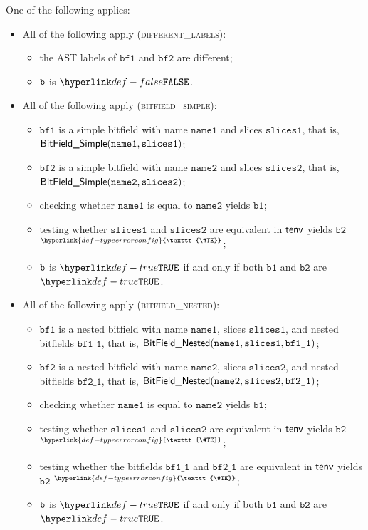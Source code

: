 \documentclass{book}
\newcommand\TypeErrorConfig[0]{\hyperlink{def-typeerrorconfig}{\texttt{\#TE}}}
\newcommand\ProseOrTypeError[0]{\hyperlink{def-proseortypeerror}{$^{\TypeErrorConfig}$}}
\newcommand\bfone[0]{\texttt{bf1}}
\newcommand\bftwo[0]{\texttt{bf2}}
\newcommand\bfoneone[0]{\texttt{bf1\_1}}
\newcommand\bftwoone[0]{\texttt{bf2\_1}}
\newcommand\vbone[0]{\texttt{b1}}
\newcommand\vbtwo[0]{\texttt{b2}}
\newcommand\nameone[0]{\texttt{name1}}
\newcommand\nametwo[0]{\texttt{name2}}
\newcommand\slicesone[0]{\texttt{slices1}}
\newcommand\slicestwo[0]{\texttt{slices2}}
\begin{document}
One of the following applies:
\begin{itemize}
  \item All of the following apply (\textsc{different\_labels}):
  \begin{itemize}
    \item the AST labels of $\bfone$ and $\bftwo$ are different;
    \item $\texttt{b}$ is $\False$.
  \end{itemize}

  \item All of the following apply (\textsc{bitfield\_simple}):
  \begin{itemize}
    \item $\bfone$ is a simple bitfield with name $\nameone$ and slices $\slicesone$, that is, \\ $\BitFieldSimple(\nameone, \slicesone)$;
    \item $\bftwo$ is a simple bitfield with name $\nametwo$ and slices $\slicestwo$, that is, \\ $\BitFieldSimple(\nametwo, \slicestwo)$;
    \item checking whether $\nameone$ is equal to $\nametwo$ yields $\vbone$;
    \item testing whether $\slicesone$ and $\slicestwo$ are equivalent in $\textsf{tenv}$ yields $\vbtwo$ \ProseOrTypeError;
    \item $\texttt{b}$ is $\True$ if and only if both $\vbone$ and $\vbtwo$ are $\True$.
  \end{itemize}

  \item All of the following apply (\textsc{bitfield\_nested}):
  \begin{itemize}
    \item $\bfone$ is a nested bitfield with name $\nameone$, slices $\slicesone$, and nested bitfields $\bfoneone$, that is,
          $\BitFieldNested(\nameone, \slicesone, \bfoneone)$;
    \item $\bftwo$ is a nested bitfield with name $\nametwo$, slices $\slicestwo$, and nested bitfields $\bftwoone$, that is,
          $\BitFieldNested(\nametwo, \slicestwo, \bftwoone)$;
    \item checking whether $\nameone$ is equal to $\nametwo$ yields $\vbone$;
    \item testing whether $\slicesone$ and $\slicestwo$ are equivalent in $\textsf{tenv}$ yields $\vbtwo$ \ProseOrTypeError;
    \item testing whether the bitfields $\bfoneone$ and $\bftwoone$ are equivalent in $\textsf{tenv}$ yields $\vbtwo$ \ProseOrTypeError;
    \item $\texttt{b}$ is $\True$ if and only if both $\vbone$ and $\vbtwo$ are $\True$.
  \end{itemize}


\end{itemize}
\end{document}
